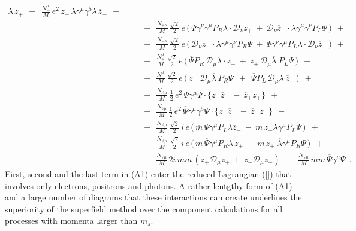 \documentclass[12pt]{revtex4}
\begin{document}
\begin{eqnarray}
\lambda\, z_+ 
~~-~~
\frac{N_-^\mu}{M}\, e^2\,
z_-\, \overline{\lambda}\gamma^\mu\gamma^5
\lambda\, \overline{z}_-
~~-~~ \\
\nonumber
&&
~~-~~
\frac{N_{+\mu}}{M}\,
\frac{\sqrt{2}}{2}\, e\,
\Big(\,
\overline{\Psi} \gamma^\nu\gamma^\mu P_R
\lambda \cdot \mathcal{D}_\nu z_+ 
~+~
\mathcal{D}_\nu \overline{z}_+ \cdot
\overline{\lambda} \gamma^\mu \gamma^\nu
P_L \Psi
\,
\Big)
~~+~~ \\
\nonumber
&&
~~+~~
\frac{N_{-\mu}}{M}\,
\frac{\sqrt{2}}{2}\,e\,
\Big(\,
\mathcal{D}_\nu z_- \cdot
\overline{\lambda}\gamma^\mu\gamma^\nu P_R \Psi
~+~
\overline{\Psi}\gamma^\nu\gamma^\mu P_L \lambda
\cdot \mathcal{D}_\nu \overline{z}_-
\,
\Big)
~~+~~ \\
\label{LV_matter_component}
&&
~~+~~
\frac{N_+^\mu}{M}\,
\frac{\sqrt{2}}{2}\, e\,
\Big(\,
\overline{\Psi}P_R\, \mathcal{D}_\mu \lambda
\cdot z_+ 
~+~
\overline{z}_+ \,
\mathcal{D}_\mu 
\overline{\lambda}\; P_L \Psi
\,\Big)
~~-~~ \\
\nonumber
&&
~~-~~
\frac{N_-^\mu}{M}\,
\frac{\sqrt{2}}{2}\, e\,
\Big(\,
z_-\; \mathcal{D}_\mu \overline{\lambda} ~
P_R \Psi 
~~+~~
\overline{\Psi} P_L \, \mathcal{D}_\mu \lambda ~
\overline{z}_-
\,\Big) 
~~+~~ \\
\nonumber
&&
~~+~~ 
\frac{N_{A\mu}}{M}\,
\frac{1}{2}\, e^2\,
\overline{\Psi}\gamma^\mu  \Psi \cdot
\Big\{
  z_-  \overline{z}_- 
  ~-~
  \overline{z}_+  z_+
\Big\}
~~+~~ \\
\nonumber
&&
~~+~~
\frac{N_{V\mu}}{M}\,
\frac{1}{2}\, e^2\,
\overline{\Psi}\gamma^\mu \gamma^5 \Psi \cdot
\Big\{
  z_-  \overline{z}_- 
  ~-~
  \overline{z}_+  z_+
\Big\}
~~-~~ \\
\nonumber
&&
~~-~~
\frac{N_{A\mu}}{M}\,
\frac{\sqrt{2}}{2}\, i\, e\,
\Big(\,
\overline{m}\, \overline{\Psi} \gamma^\mu P_L
\lambda \overline{z}_- 
~-~
m\, z_- \overline{\lambda}
\gamma^\mu P_L \Psi
\,\Big)
~~+~~ \\
\nonumber
&&
~~+~~
\frac{N_{A\mu}}{M}\,
\frac{\sqrt{2}}{2}\, i\, e\,
\Big(\,
m\, \overline{\Psi}\gamma^\mu P_R \lambda\, z_+ 
~-~
\overline{m}\, \overline{z}_+\; \overline{\lambda}
\gamma^\mu P_R \Psi
\,\Big)
~~+~~ \\
\nonumber
&&
~~+~~ 
\frac{N_{V\mu}}{M}\, 2 i\, m \overline{m}\,
\left( 
\overline{z}_+ \mathcal{D}_\mu z_+ 
~+~
z_- \mathcal{D}_\mu \overline{z}_-
\right)~~+~~
\frac{N_{V\mu}}{M}\,
m \overline{m} \,
\overline{\Psi} \gamma^\mu \Psi
~~.
\end{eqnarray}
First, second and the last term in (A1) enter the 
reduced Lagrangian (\ref{}) that involves only electrons,
positrons and photons. A rather lentgthy form of (A1)
and a large number of diagrams that these 
interactions can create underlines the superiority of the 
superfield method over the component calculations for 
all processes with momenta larger than $m_s$. 
\end{document}
